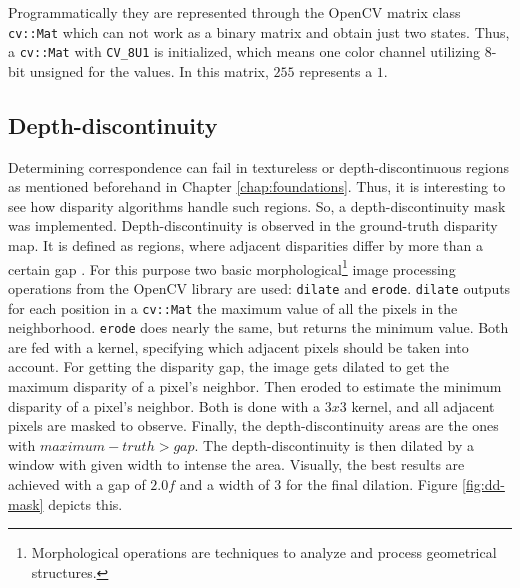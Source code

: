 \noindent Programmatically they are represented through the OpenCV matrix class \texttt{cv::Mat} which can not work as a binary matrix and obtain just two states.
Thus, a \texttt{cv::Mat} with \texttt{CV\_8U1} is initialized, which means one color channel utilizing 8-bit unsigned for the values.
In this matrix, $255$ represents a $1$.

\subsection*{Depth-discontinuity}

Determining correspondence can fail in textureless or depth-discontinuous regions as mentioned beforehand in Chapter \ref{chap:foundations}.
Thus, it is interesting to see how disparity algorithms handle such regions.
So, a depth-discontinuity mask was implemented.
Depth-discontinuity is observed in the ground-truth disparity map.
It is defined as regions, where adjacent disparities differ by more than a certain gap \citep{scharstein2002taxonomy, cyganek2011introduction}.
For this purpose two basic morphological\footnote{Morphological operations are techniques to analyze and process geometrical structures.} image processing operations from the OpenCV library are used: \texttt{dilate} and \texttt{erode}.
\texttt{dilate} outputs for each position in a \texttt{cv::Mat} the maximum value of all the pixels in the neighborhood.
\texttt{erode} does nearly the same, but returns the minimum value.
Both are fed with a kernel, specifying which adjacent pixels should be taken into account.
\newline\newline\noindent For getting the disparity gap, the image gets dilated to get the maximum disparity of a pixel's neighbor.
Then eroded to estimate the minimum disparity of a pixel's neighbor.
Both is done with a $3x3$ kernel, and all adjacent pixels are masked to observe.
Finally, the depth-discontinuity areas are the ones with $maximum - truth > gap$.
The depth-discontinuity is then dilated by a window with given width to intense the area.
Visually, the best results are achieved with a gap of $2.0f$ and a width of $3$ for the final dilation.
Figure \ref{fig:dd-mask} depicts this.

